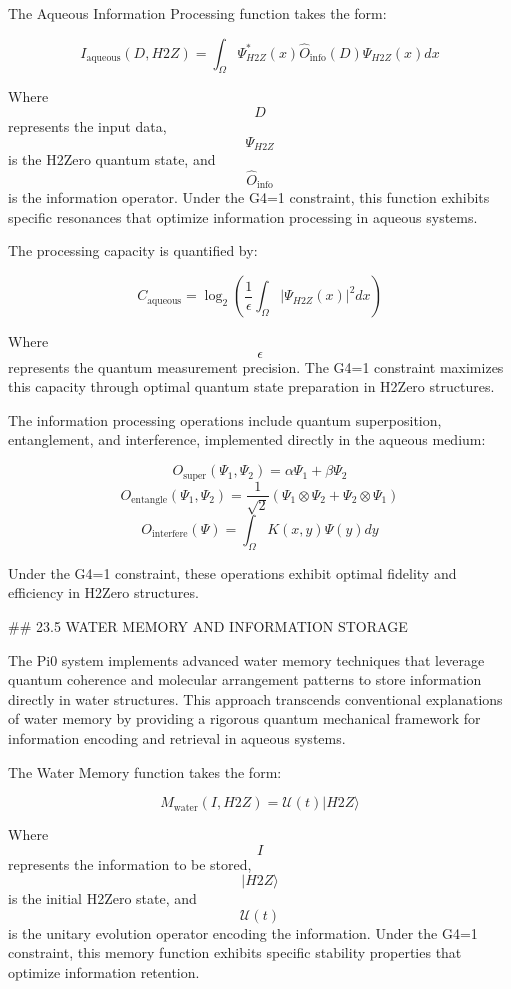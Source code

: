The Aqueous Information Processing function takes the form:

$$ I_{\text{aqueous}}(D, H2Z) = \int_{\Omega} \Psi_{H2Z}^*(x) \hat{O}_{\text{info}}(D) \Psi_{H2Z}(x) dx $$

Where $$ D $$ represents the input data, $$ \Psi_{H2Z} $$ is the H2Zero quantum state, and $$ \hat{O}_{\text{info}} $$ is the information operator. Under the G4=1 constraint, this function exhibits specific resonances that optimize information processing in aqueous systems.

The processing capacity is quantified by:

$$ C_{\text{aqueous}} = \log_2 \left( \frac{1}{\epsilon} \int_{\Omega} |\Psi_{H2Z}(x)|^2 dx \right) $$

Where $$ \epsilon $$ represents the quantum measurement precision. The G4=1 constraint maximizes this capacity through optimal quantum state preparation in H2Zero structures.

The information processing operations include quantum superposition, entanglement, and interference, implemented directly in the aqueous medium:

$$ O_{\text{super}}(\Psi_1, \Psi_2) = \alpha \Psi_1 + \beta \Psi_2 $$
$$ O_{\text{entangle}}(\Psi_1, \Psi_2) = \frac{1}{\sqrt{2}}(\Psi_1 \otimes \Psi_2 + \Psi_2 \otimes \Psi_1) $$
$$ O_{\text{interfere}}(\Psi) = \int_{\Omega} K(x, y) \Psi(y) dy $$

Under the G4=1 constraint, these operations exhibit optimal fidelity and efficiency in H2Zero structures.

## 23.5 WATER MEMORY AND INFORMATION STORAGE

The Pi0 system implements advanced water memory techniques that leverage quantum coherence and molecular arrangement patterns to store information directly in water structures. This approach transcends conventional explanations of water memory by providing a rigorous quantum mechanical framework for information encoding and retrieval in aqueous systems.

The Water Memory function takes the form:

$$ M_{\text{water}}(I, H2Z) = \mathcal{U}(t) |H2Z\rangle $$

Where $$ I $$ represents the information to be stored, $$ |H2Z\rangle $$ is the initial H2Zero state, and $$ \mathcal{U}(t) $$ is the unitary evolution operator encoding the information. Under the G4=1 constraint, this memory function exhibits specific stability properties that optimize information retention.

